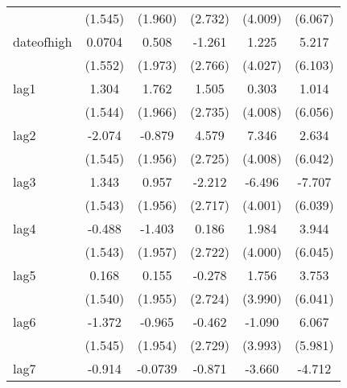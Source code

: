 {\begin{tabular}{l*{5}{c}}
            &     (1.545)         &     (1.960)         &     (2.732)         &     (4.009)         &     (6.067)         \\
[1em]
dateofhigh  &      0.0704         &       0.508         &      -1.261         &       1.225         &       5.217         \\
            &     (1.552)         &     (1.973)         &     (2.766)         &     (4.027)         &     (6.103)         \\
[1em]
lag1        &       1.304         &       1.762         &       1.505         &       0.303         &       1.014         \\
            &     (1.544)         &     (1.966)         &     (2.735)         &     (4.008)         &     (6.056)         \\
[1em]
lag2        &      -2.074         &      -0.879         &       4.579         &       7.346         &       2.634         \\
            &     (1.545)         &     (1.956)         &     (2.725)         &     (4.008)         &     (6.042)         \\
[1em]
lag3        &       1.343         &       0.957         &      -2.212         &      -6.496         &      -7.707         \\
            &     (1.543)         &     (1.956)         &     (2.717)         &     (4.001)         &     (6.039)         \\
[1em]
lag4        &      -0.488         &      -1.403         &       0.186         &       1.984         &       3.944         \\
            &     (1.543)         &     (1.957)         &     (2.722)         &     (4.000)         &     (6.045)         \\
[1em]
lag5        &       0.168         &       0.155         &      -0.278         &       1.756         &       3.753         \\
            &     (1.540)         &     (1.955)         &     (2.724)         &     (3.990)         &     (6.041)         \\
[1em]
lag6        &      -1.372         &      -0.965         &      -0.462         &      -1.090         &       6.067         \\
            &     (1.545)         &     (1.954)         &     (2.729)         &     (3.993)         &     (5.981)         \\
[1em]
lag7        &      -0.914         &     -0.0739         &      -0.871         &      -3.660         &      -4.712         \\

\end{tabular}}
